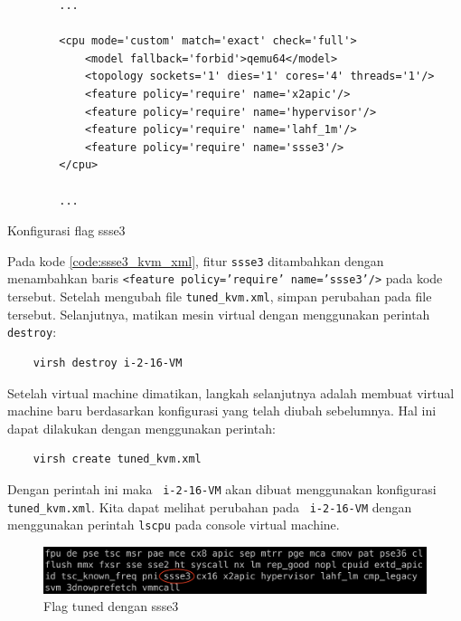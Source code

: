 \begin{listing}[H]
    \begin{verbatim}
        ...

        <cpu mode='custom' match='exact' check='full'>
            <model fallback='forbid'>qemu64</model>
            <topology sockets='1' dies='1' cores='4' threads='1'/>
            <feature policy='require' name='x2apic'/>
            <feature policy='require' name='hypervisor'/> 
            <feature policy='require' name='lahf_1m'/>
            <feature policy='require' name='ssse3'/>
        </cpu>
        
        ...
    \end{verbatim}
    \caption{Konfigurasi flag ssse3}
    \label{code:ssse3_kvm_xml}
\end{listing}

Pada kode \ref{code:ssse3_kvm_xml}, fitur \texttt{ssse3} ditambahkan dengan menambahkan baris \texttt{<feature policy='require' name='ssse3'/>} pada kode tersebut. Setelah mengubah file \texttt{tuned\_kvm.xml}, simpan perubahan pada file tersebut. Selanjutnya, matikan mesin virtual dengan menggunakan perintah \texttt{destroy}:

\begin{lstlisting}
    virsh destroy i-2-16-VM
\end{lstlisting}

Setelah virtual machine dimatikan, langkah selanjutnya adalah membuat virtual machine baru berdasarkan konfigurasi yang telah diubah sebelumnya. Hal ini dapat dilakukan dengan menggunakan perintah:

\begin{lstlisting}
    virsh create tuned_kvm.xml
\end{lstlisting}

Dengan perintah ini maka \vm\ \texttt{i-2-16-VM} akan dibuat menggunakan konfigurasi \texttt{tuned\_kvm.xml}. Kita dapat melihat perubahan pada \vm\ \texttt{i-2-16-VM} dengan menggunakan perintah \texttt{lscpu} pada console virtual machine.

\begin{figure}
    \centering
    \includegraphics[width=1\textwidth]
    {assets/pics/lscpu_ssse3.jpeg}
    \caption{Flag tuned dengan ssse3}
    \label{fig:lscpu_ssse3}
\end{figure}

